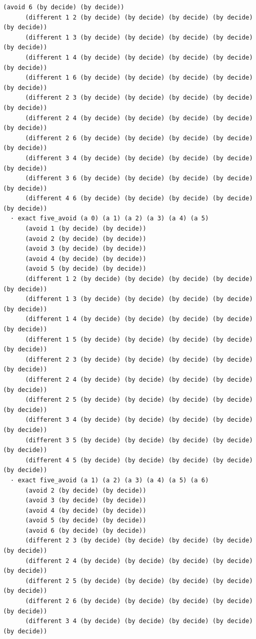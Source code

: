 \documentclass[11pt,a4paper]{article}
\begin{document}
\begin{Verbatim}[breaklines,breakanywhere,fontsize=\footnotesize]
      (avoid 6 (by decide) (by decide))
      (different 1 2 (by decide) (by decide) (by decide) (by decide) (by decide))
      (different 1 3 (by decide) (by decide) (by decide) (by decide) (by decide))
      (different 1 4 (by decide) (by decide) (by decide) (by decide) (by decide))
      (different 1 6 (by decide) (by decide) (by decide) (by decide) (by decide))
      (different 2 3 (by decide) (by decide) (by decide) (by decide) (by decide))
      (different 2 4 (by decide) (by decide) (by decide) (by decide) (by decide))
      (different 2 6 (by decide) (by decide) (by decide) (by decide) (by decide))
      (different 3 4 (by decide) (by decide) (by decide) (by decide) (by decide))
      (different 3 6 (by decide) (by decide) (by decide) (by decide) (by decide))
      (different 4 6 (by decide) (by decide) (by decide) (by decide) (by decide))
  · exact five_avoid (a 0) (a 1) (a 2) (a 3) (a 4) (a 5)
      (avoid 1 (by decide) (by decide))
      (avoid 2 (by decide) (by decide))
      (avoid 3 (by decide) (by decide))
      (avoid 4 (by decide) (by decide))
      (avoid 5 (by decide) (by decide))
      (different 1 2 (by decide) (by decide) (by decide) (by decide) (by decide))
      (different 1 3 (by decide) (by decide) (by decide) (by decide) (by decide))
      (different 1 4 (by decide) (by decide) (by decide) (by decide) (by decide))
      (different 1 5 (by decide) (by decide) (by decide) (by decide) (by decide))
      (different 2 3 (by decide) (by decide) (by decide) (by decide) (by decide))
      (different 2 4 (by decide) (by decide) (by decide) (by decide) (by decide))
      (different 2 5 (by decide) (by decide) (by decide) (by decide) (by decide))
      (different 3 4 (by decide) (by decide) (by decide) (by decide) (by decide))
      (different 3 5 (by decide) (by decide) (by decide) (by decide) (by decide))
      (different 4 5 (by decide) (by decide) (by decide) (by decide) (by decide))
  · exact five_avoid (a 1) (a 2) (a 3) (a 4) (a 5) (a 6)
      (avoid 2 (by decide) (by decide))
      (avoid 3 (by decide) (by decide))
      (avoid 4 (by decide) (by decide))
      (avoid 5 (by decide) (by decide))
      (avoid 6 (by decide) (by decide))
      (different 2 3 (by decide) (by decide) (by decide) (by decide) (by decide))
      (different 2 4 (by decide) (by decide) (by decide) (by decide) (by decide))
      (different 2 5 (by decide) (by decide) (by decide) (by decide) (by decide))
      (different 2 6 (by decide) (by decide) (by decide) (by decide) (by decide))
      (different 3 4 (by decide) (by decide) (by decide) (by decide) (by decide))

\end{Verbatim}
\end{document}
